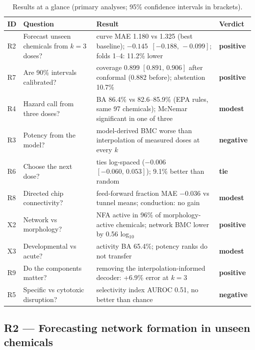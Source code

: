 \documentclass[11pt,a4paper]{article}
\newcommand{\ci}[2]{\ensuremath{[#1,\,#2]}}          %
\newcommand{\sgn}[1]{\ensuremath{#1}}                  %
\newcommand{\verdict}[1]{\textsf{\small\bfseries #1}}
\newcommand{\vpos}{\verdict{\textcolor{good}{positive}}}
\newcommand{\vtie}{\verdict{\textcolor{tie}{tie}}}
\newcommand{\vneg}{\verdict{\textcolor{bad}{negative}}}
\newcommand{\vmod}{\verdict{\textcolor{tie}{modest}}}
\newcommand{\RtwoNT}{1.180}
\newcommand{\RtwoBase}{1.325}
\newcommand{\RtwoDiff}{-0.145}
\newcommand{\RtwoCI}{\ci{ -0.188 }{ -0.099 }}
\newcommand{\RtwoFRel}{11.2}
\newcommand{\RsevCov}{0.899}
\newcommand{\RsevCI}{\ci{ 0.891 }{ 0.906 }}
\newcommand{\RsevPar}{0.882}
\newcommand{\RsevAbst}{10.7}
\newcommand{\RfourN}{97}
\newcommand{\RfourBA}{86.4}
\newcommand{\RfourEpaLo}{82.6}
\newcommand{\RfourEpaHi}{85.9}
\newcommand{\RsixRandRel}{9.1}
\begin{document}
\begin{table}[t]
\centering\small
\caption{Results at a glance (primary analyses; 95\% confidence intervals in brackets).}\label{tab:glance}
\begin{tabularx}{\linewidth}{@{}P{0.8cm}P{4.2cm}LP{1.5cm}@{}}
\toprule
ID & Question & Result & Verdict \\
\midrule
R2 & Forecast unseen chemicals from \(k=3\) doses? & curve MAE \RtwoNT{} vs \RtwoBase{} (best baseline); \sgn{\RtwoDiff}\ \RtwoCI; folds 1--4: \RtwoFRel\% lower & \vpos \\
R7 & Are 90\% intervals calibrated? & coverage \RsevCov{} \RsevCI{} after conformal (\RsevPar{} before); abstention \RsevAbst\% & \vpos \\
R4 & Hazard call from three doses? & BA \RfourBA\% vs \RfourEpaLo--\RfourEpaHi\% (EPA rules, same \RfourN{} chemicals); McNemar significant in one of three & \vmod \\
R3 & Potency from the model? & model-derived BMC worse than interpolation of measured doses at every \(k\) & \vneg \\
R6 & Choose the next dose? & ties log-spaced (\sgn{ -0.006 } \ci{ -0.060 }{ 0.053 }); \RsixRandRel\% better than random & \vtie \\
R8 & Directed chip connectivity? & feed-forward fraction MAE \sgn{ -0.036 } vs tunnel means; conduction: no gain & \vmod \\
X2 & Network vs morphology? & NFA active in 96\% of morphology-active chemicals; network BMC lower by 0.56 log\(_{10}\) & \vpos \\
X3 & Developmental vs acute? & activity BA 65.4\%; potency ranks do not transfer & \vmod \\
R9 & Do the components matter? & removing the interpolation-informed decoder: +6.9\% error at \(k=3\) & \vpos \\
R5 & Specific vs cytotoxic disruption? & selectivity index AUROC 0.51, no better than chance & \vneg \\
\bottomrule
\end{tabularx}
\end{table}

\subsection{R2 --- Forecasting network formation in unseen chemicals}\label{sec:r2}
\end{document}

